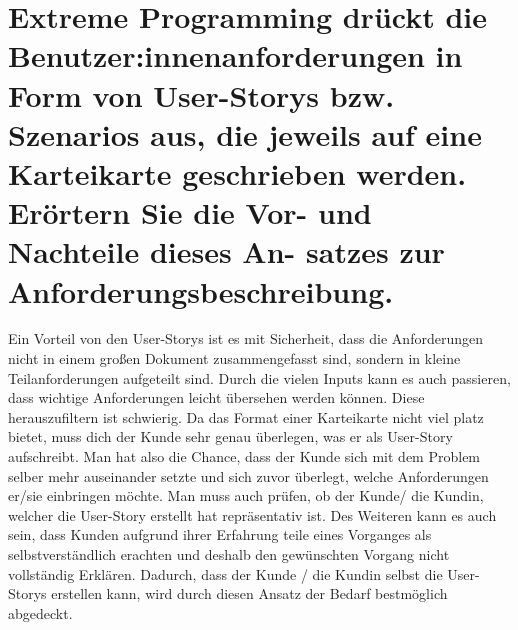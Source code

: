 \documentclass[12pt]{article}
\begin{document}
\section{Extreme Programming drückt die Benutzer:innenanforderungen in Form von User-Storys bzw. Szenarios
aus, die jeweils auf eine Karteikarte geschrieben werden. Erörtern Sie die Vor- und Nachteile dieses An-
satzes zur Anforderungsbeschreibung.}
Ein Vorteil von den User-Storys ist es mit Sicherheit, dass die Anforderungen nicht in einem großen Dokument zusammengefasst sind, sondern in kleine Teilanforderungen aufgeteilt sind. Durch die vielen Inputs kann es auch passieren, dass wichtige Anforderungen leicht übersehen werden können. Diese herauszufiltern ist schwierig.
Da das Format einer Karteikarte nicht viel platz bietet, muss dich der Kunde sehr genau überlegen, was er als User-Story aufschreibt. Man hat also die Chance, dass der Kunde sich mit dem Problem selber mehr auseinander setzte und sich zuvor überlegt, welche Anforderungen er/sie einbringen möchte. Man muss auch prüfen, ob der Kunde/ die Kundin, welcher die User-Story erstellt hat repräsentativ ist. Des Weiteren kann es auch sein, dass Kunden aufgrund ihrer Erfahrung teile eines Vorganges als selbstverständlich erachten und deshalb den gewünschten Vorgang nicht vollständig Erklären. Dadurch, dass der Kunde / die Kundin selbst die User-Storys erstellen kann, wird durch diesen Ansatz der Bedarf bestmöglich abgedeckt.
\pagebreak
\end{document}
